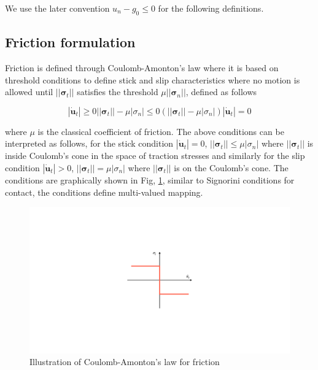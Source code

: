  We use the later convention  $u_n-g_0 \leq 0$ for the following definitions.


\subsection{Friction formulation}

Friction is defined through Coulomb-Amonton's law where it is based on threshold conditions to define stick and slip characteristics where no motion is allowed until $||\bm\sigma_{t}||$ satisfies the threshold $\mu ||\bm\sigma_{n}||$, defined as follows

\begin{subequations}\label{fric_bc}
\begin{equation}
|\bm{\dot{u}}_t| \geq 0
\end{equation} 

\begin{equation}
||\bm\sigma_{t}||-\mu|\sigma_{n}| \leq 0
\end{equation}

\begin{equation}
 (||\bm\sigma_{t}||-\mu|\sigma_{n}|)|\bm{\dot{u}}_t| = 0
\end{equation}

\end{subequations}

where $\mu$ is the classical coefficient of friction. The above conditions can be interpreted as follows, for the stick condition $|\bm{\dot{u}}_t|=0$,  $||\bm\sigma_{t}||\leq\mu|\sigma_{n}| $ where $||\bm\sigma_{t}||$  is inside Coulomb's cone in the space of traction stresses and similarly for the slip condition $|\bm{\dot{u}}_t|>0$,  $||\bm\sigma_{t}||=\mu|\sigma_{n}| $ where $||\bm\sigma_{t}||$ is on the Coulomb's cone. The conditions are graphically shown in Fig, \ref{fig:Coul_Amon}, similar to Signorini conditions for contact, the conditions define multi-valued mapping. \\

\begin{figure}
    \centering
    \includegraphics[scale=0.43]{Chapter1/Pictures/Coul_Amon.pdf}
    \caption{Illustration of Coulomb-Amonton's law for friction}
    \label{fig:Coul_Amon}
\end{figure}


